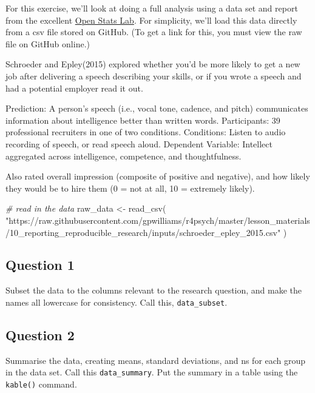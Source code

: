 \documentclass[
]{book}
\newenvironment{Shaded}{\begin{snugshade}}{\end{snugshade}}
\newcommand{\CommentTok}[1]{\textcolor[rgb]{0.56,0.35,0.01}{\textit{#1}}}
\newcommand{\FunctionTok}[1]{\textcolor[rgb]{0.00,0.00,0.00}{#1}}
\newcommand{\NormalTok}[1]{#1}
\newcommand{\OtherTok}[1]{\textcolor[rgb]{0.56,0.35,0.01}{#1}}
\newcommand{\StringTok}[1]{\textcolor[rgb]{0.31,0.60,0.02}{#1}}
\begin{document}
For this exercise, we'll look at doing a full analysis using a data set and report from the excellent \href{https://sites.trinity.edu/osl}{Open Stats Lab}. For simplicity, we'll load this data directly from a csv file stored on GitHub. (To get a link for this, you must view the raw file on GitHub online.)

Schroeder and Epley(2015) explored whether you'd be more likely to get a new job after delivering a speech describing your skills, or if you wrote a speech and had a potential employer read it out.

Prediction: A person's speech (i.e., vocal tone, cadence, and pitch) communicates information about intelligence better than written words.
Participants: 39 professional recruiters in one of two conditions.
Conditions: Listen to audio recording of speech, or read speech aloud.
Dependent Variable: Intellect aggregated across intelligence, competence, and thoughtfulness.

Also rated overall impression (composite of positive and negative), and how likely they would be to hire them (0 = not at all, 10 = extremely likely).

\begin{Shaded}
\begin{Highlighting}[]
\CommentTok{\# read in the data}
\NormalTok{raw\_data }\OtherTok{\textless{}{-}} \FunctionTok{read\_csv}\NormalTok{(}
  \StringTok{"https://raw.githubusercontent.com/gpwilliams/r4psych/master/lesson\_materials/10\_reporting\_reproducible\_research/inputs/schroeder\_epley\_2015.csv"}
\NormalTok{  )}
\end{Highlighting}
\end{Shaded}

\hypertarget{question-1-9}{%
\subsection{Question 1}\label{question-1-9}}

Subset the data to the columns relevant to the research question, and make the names all lowercase for consistency. Call this, \texttt{data\_subset}.

\hypertarget{question-2-9}{%
\subsection{Question 2}\label{question-2-9}}

Summarise the data, creating means, standard deviations, and ns for each group in the data set. Call this \texttt{data\_summary}. Put the summary in a table using the \texttt{kable()} command.
\end{document}
